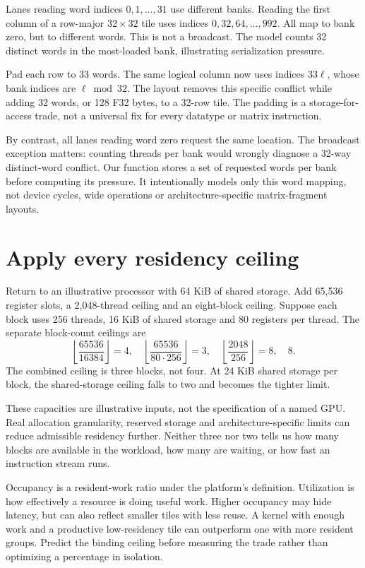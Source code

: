 Lanes reading word indices $0,1,\ldots,31$ use
different banks. Reading the first column of a
row-major $32\times32$ tile uses indices
$0,32,64,\ldots,992$. All map to bank zero,
but to different words. This is not a broadcast.
The model counts 32 distinct words in the most-loaded
bank, illustrating serialization pressure.

Pad each row to 33 words. The same logical column
now uses indices $33\ell$, whose bank indices
are $\ell\bmod32$. The layout removes this
specific conflict while adding 32 words, or 128
F32 bytes, to a 32-row tile. The padding is a
storage-for-access trade, not a universal fix for
every datatype or matrix instruction.

By contrast, all lanes reading word zero request
the same location. The broadcast exception matters:
counting threads per bank would wrongly diagnose a
32-way distinct-word conflict. Our function stores
a set of requested words per bank before computing
its pressure. It intentionally models only this
word mapping, not device cycles, wide operations
or architecture-specific matrix-fragment layouts.

\section{Apply every residency ceiling}
Return to an illustrative processor with 64 KiB of
shared storage. Add 65,536 register slots, a
2,048-thread ceiling and an eight-block ceiling.
Suppose each block uses 256 threads, 16 KiB
of shared storage and 80 registers per thread.
The separate block-count ceilings are
\[
 \left\lfloor\frac{65536}{16384}\right\rfloor=4,\quad
 \left\lfloor\frac{65536}{80\cdot256}\right\rfloor=3,\quad
 \left\lfloor\frac{2048}{256}\right\rfloor=8,\quad 8.
\]
The combined ceiling is three blocks, not four.
At 24 KiB shared storage per block, the shared-storage
ceiling falls to two and becomes the tighter limit.

These capacities are illustrative inputs, not the
specification of a named GPU. Real allocation granularity,
reserved storage and architecture-specific limits can
reduce admissible residency further. Neither three
nor two tells us how many blocks are available in
the workload, how many are waiting, or how fast an
instruction stream runs.

Occupancy is a resident-work ratio under the platform's
definition. Utilization is how effectively a resource
is doing useful work. Higher occupancy may hide
latency, but can also reflect smaller tiles with less
reuse. A kernel with enough work and a productive
low-residency tile can outperform one with more
resident groups. Predict the binding ceiling before
measuring the trade rather than optimizing a percentage
in isolation.

